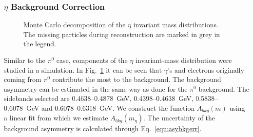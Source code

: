 \subsubsection{\texorpdfstring{$\eta$ Background Correction}{eta background correction}}
\begin{figure}[H]
  \centering     
  \caption[Monte Carlo decomposition of the invariant-mass distribution around the $\eta$ mass]{Monte Carlo decomposition of the $\eta$ invariant mass distributions. The missing particles during reconstruction are marked in grey in the legend.}
  \label{fig:etacomponent}
\end{figure}
Similar to the $\pi^0$ case, components of the $\eta$ invariant-mass distribution were studied in a simulation. In Fig.~\ref{fig:etacomponent} it can be seen that $\gamma$'s and electrons originally coming from $\pi^0$ contribute the most to the background. The background asymmetry can be estimated in the same way as done for the $\pi^0$ background. The sidebands  selected are 0.4638--0.4878~GeV, 0.4398--0.4638~GeV, 0.5838--0.6078~GeV and 0.6078--0.6318~GeV. We construct the function $A_{bkg}(m)$ using a linear fit from which we estimate  $A_{bkg}(m_{\eta})$. The uncertainty of the background asymmetry is calculated through Eq.~\eqref{eqn:asybkgerr}.

